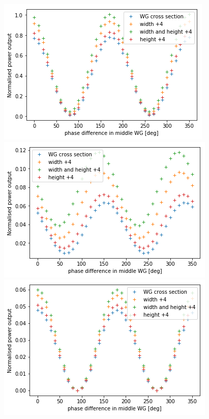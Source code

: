 \begin{figure}[htbp]
  \centering
  \begin{minipage}[b]{.33\textwidth}
    \centering
  \includegraphics[scale=.35]{picture/integrating_area/phase_python1.png}
  \end{minipage}%
  \hspace{0.2 cm}
  \begin{minipage}[b]{.33\textwidth}
    \centering   \includegraphics[scale=.35]{picture/integrating_area/phase_python2.png}
  \end{minipage}%
  \hspace{0.2 cm}
  \begin{minipage}[b]{.33\textwidth}
    \centering   \includegraphics[scale=.35]{picture/integrating_area/phase_python3.png}

\end{minipage}
\end{figure}
